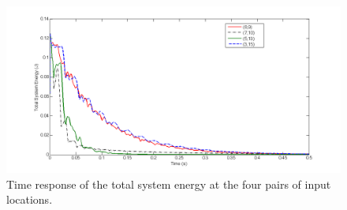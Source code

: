 \documentclass[11pt]{ucthesis}
\begin{document}
\begin{figure}[thpb]
\centering
\includegraphics[width=0.9\linewidth]{Figures/twoinputE.png}
\caption{Time response of the total system energy at the four pairs of input locations.}
\label{twosystemE}
\end{figure}
\end{document}
